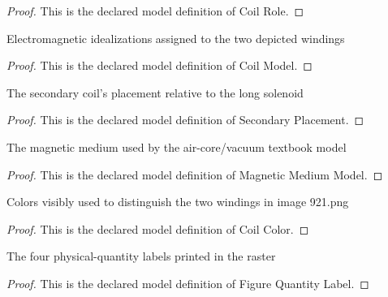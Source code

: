 \begin{proof}
  This is the declared model definition of Coil Role.
\end{proof}
\begin{definition}
  \label{def:physics:phyx-mini-0921:phyxminiproblems-problemphyxmini0921-coilmodel}
  Electromagnetic idealizations assigned to the two depicted windings
\end{definition}
\begin{proof}
  This is the declared model definition of Coil Model.
\end{proof}
\begin{definition}
  \label{def:physics:phyx-mini-0921:phyxminiproblems-problemphyxmini0921-secondaryplacement}
  The secondary coil's placement relative to the long solenoid
\end{definition}
\begin{proof}
  This is the declared model definition of Secondary Placement.
\end{proof}
\begin{definition}
  \label{def:physics:phyx-mini-0921:phyxminiproblems-problemphyxmini0921-magneticmediummodel}
  The magnetic medium used by the air-core/vacuum textbook model
\end{definition}
\begin{proof}
  This is the declared model definition of Magnetic Medium Model.
\end{proof}
\begin{definition}
  \label{def:physics:phyx-mini-0921:phyxminiproblems-problemphyxmini0921-coilcolor}
  Colors visibly used to distinguish the two windings in image 921.png
\end{definition}
\begin{proof}
  This is the declared model definition of Coil Color.
\end{proof}
\begin{definition}
  \label{def:physics:phyx-mini-0921:phyxminiproblems-problemphyxmini0921-figurequantitylabel}
  The four physical-quantity labels printed in the raster
\end{definition}
\begin{proof}
  This is the declared model definition of Figure Quantity Label.
\end{proof}
